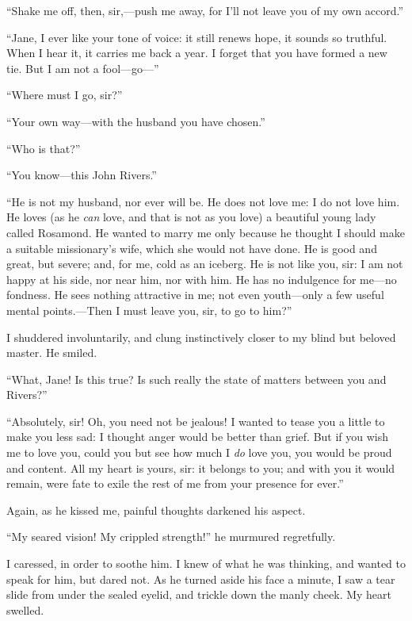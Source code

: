 \enquote{Shake me off, then, sir,---push me away, for I'll not leave you
of my own accord.}

\enquote{Jane, I ever like your tone of voice: it still renews hope, it
sounds so truthful. When I hear it, it carries me back a year. I
forget that you have formed a new tie. But I am not a fool---go---}

\enquote{Where must I go, sir?}

\enquote{Your own way---with the husband you have chosen.}

\enquote{Who is that?}

\enquote{You know---this \St{} John Rivers.}

\enquote{He is not my husband, nor ever will be. He does not love me: I do not
love him. He loves (as he \emph{can} love, and that is not as you love)
a beautiful young lady called Rosamond. He wanted to marry me only
because he thought I should make a suitable missionary's wife, which she
would not have done. He is good and great, but severe; and, for me,
cold as an iceberg. He is not like you, sir: I am not happy at his
side, nor near him, nor with him. He has no indulgence for me---no
fondness. He sees nothing attractive in me; not even youth---only a few
useful mental points.---Then I must leave you, sir, to go to him?}

I shuddered involuntarily, and clung instinctively closer to my blind
but beloved master. He smiled.

\enquote{What, Jane! Is this true? Is such really the state of matters
between you and Rivers?}

\enquote{Absolutely, sir! Oh, you need not be jealous! I wanted to tease you
a little to make you less sad: I thought anger would be better than
grief. But if you wish me to love you, could you but see how much I
\emph{do} love you, you would be proud and content. All my heart is
yours, sir: it belongs to you; and with you it would remain, were fate
to exile the rest of me from your presence for ever.}

Again, as he kissed me, painful thoughts darkened his aspect.

\enquote{My seared vision! My crippled strength!} he murmured
regretfully.

I caressed, in order to soothe him. I knew of what he was thinking, and
wanted to speak for him, but dared not. As he turned aside his face a
minute, I saw a tear slide from under the sealed eyelid, and trickle
down the manly cheek. My heart swelled.

